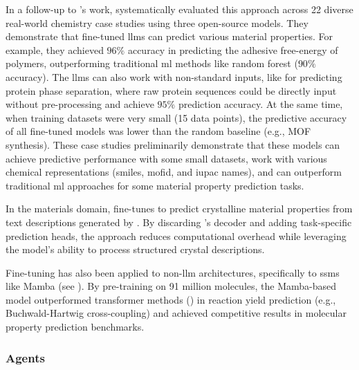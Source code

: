 In a follow-up to \textcite{jablonka2024leveraging}'s work, \textcite{vanherck2025assessment} systematically evaluated this approach across 22 diverse real-world chemistry case studies using three open-source models. They demonstrate that fine-tuned \glspl{llm} can predict various material properties. For example, they achieved $96\%$ accuracy in predicting the adhesive free-energy of polymers, outperforming traditional \gls{ml} methods like random forest ($90\%$ accuracy). The \glspl{llm} can also work with non-standard inputs, like for predicting protein phase separation, where raw protein sequences could be directly input without pre-processing and achieve $95\%$ prediction accuracy. At the same time, when training datasets were very small (15 data points), the predictive accuracy of all fine-tuned models was lower than the random baseline (e.g., MOF synthesis). These case studies preliminarily demonstrate that these models can achieve predictive performance with some small datasets, work with various chemical representations (\gls{smiles}, \gls{mof}id, and \gls{iupac} names), and can outperform traditional \gls{ml} approaches for some material property prediction tasks.

In the materials domain,  fine-tunes \autocite{raffel2020exploring} to predict crystalline material properties from text descriptions generated by \autocite{ganose2019robocrystallographer}. By discarding ’s decoder and adding task-specific prediction heads, the approach reduces computational overhead while leveraging the model’s ability to process structured crystal descriptions. 

Fine-tuning has also been applied to non-\gls{llm} architectures, specifically to \glspl{ssm} like Mamba (see ). By pre-training on 91 million molecules, the Mamba-based model  outperformed transformer methods (\autocite{krzyzanowski2025exploring}) in reaction yield prediction (e.g., Buchwald-Hartwig cross-coupling) and achieved competitive results in molecular property prediction benchmarks.\autocite{soares2025mamba-based} 

\subsubsection{Agents}

